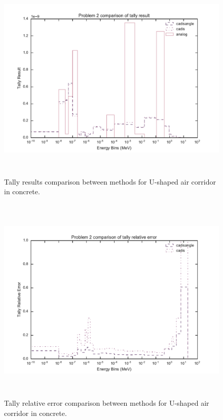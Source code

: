 \begin{figure}[h!]
  \centering
  \includegraphics[height=10cm]{./chapters/characterization_probs/figures/char/prob_2/problem_2_tally_result_compare.pdf}
  \caption[Tally results comparison between methods for U-shaped air corridor in
  concrete.]
  {Tally results comparison between methods for U-shaped air corridor in
  concrete.}
  \label{fig:ucorridorresult}
\end{figure}

\begin{figure}[h!]
  \centering
  \includegraphics[height=10cm]{./chapters/characterization_probs/figures/char/prob_2/problem_2_tally_error_compare.pdf}
  \caption[Tally relative error comparison between methods for U-shaped air
  corridor in concrete.]
  {Tally relative error comparison between methods for U-shaped air corridor in
  concrete.}
  \label{fig:ucorridorerror}
\end{figure}

